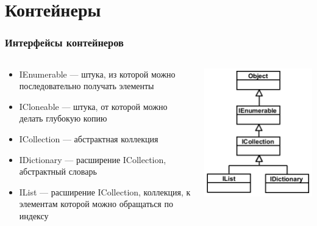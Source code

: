 \documentclass{../../slides-style}
\begin{document}
    \begin{frame}[plain]
        \titlepage
    \end{frame}

    \section{Контейнеры}

    \begin{frame}
        \frametitle{Интерфейсы контейнеров}
        \begin{columns}
            \begin{column}{0.65\textwidth}
                \begin{itemize}
                    \item IEnumerable --- штука, из которой можно последовательно получать элементы
                    \item ICloneable --- штука, от которой можно делать глубокую копию
                    \item ICollection --- абстрактная коллекция
                    \item IDictionary --- расширение ICollection, абстрактный словарь
                    \item IList --- расширение ICollection, коллекция, к элементам которой можно обращаться по индексу
                \end{itemize}
            \end{column}
            \begin{column}{0.3\textwidth}
                \includegraphics[width=\textwidth]{interfaces.png}
            \end{column}
        \end{columns}
    \end{frame}
\end{document}
